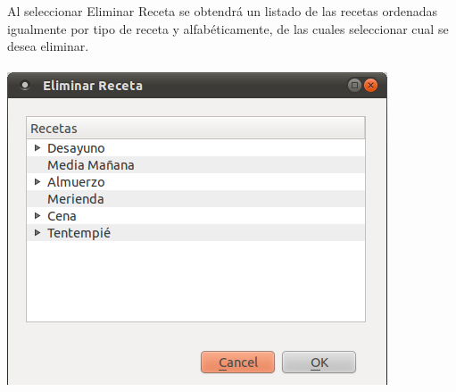 \documentclass[12pt, spanish]{article}
\begin{document}
\begin{enumerate}
Al seleccionar Eliminar Receta se obtendrá un listado de las recetas ordenadas igualmente por tipo de receta y alfabéticamente, de las cuales seleccionar cual se desea eliminar.\\\\
\includegraphics[scale=0.5]{Image/receta-eliminar.png}
\end{enumerate}
\newpage
\end{document}

